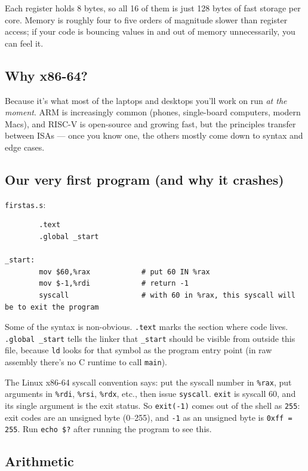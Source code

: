 \documentclass[11pt]{article}
\begin{document}
Each register holds 8 bytes, so all 16 of them is just 128 bytes of
fast storage per core. Memory is roughly four to five orders of
magnitude slower than register access; if your code is bouncing values
in and out of memory unnecessarily, you can feel it.

\subsection*{Why x86-64?}

Because it's what most of the laptops and desktops you'll work on run
\emph{at the moment}. ARM is increasingly common (phones, single-board
computers, modern Macs), and RISC-V is open-source and growing fast,
but the principles transfer between ISAs --- once you know one, the
others mostly come down to syntax and edge cases.

\subsection*{Our very first program (and why it crashes)}

\texttt{firstas.s}:

\begin{lstlisting}
        .text
        .global _start

_start:
        mov $60,%rax            # put 60 IN %rax
        mov $-1,%rdi            # return -1
        syscall                 # with 60 in %rax, this syscall will be to exit the program
\end{lstlisting}

Some of the syntax is non-obvious. \texttt{.text} marks the section
where code lives. \texttt{.global \_start} tells the linker that
\texttt{\_start} should be visible from outside this file, because
\texttt{ld} looks for that symbol as the program entry point (in raw
assembly there's no C runtime to call \texttt{main}).

The Linux x86-64 syscall convention says: put the syscall number in
\texttt{\%rax}, put arguments in \texttt{\%rdi}, \texttt{\%rsi},
\texttt{\%rdx}, etc., then issue \texttt{syscall}. \texttt{exit} is
syscall 60, and its single argument is the exit status. So
\texttt{exit(-1)} comes out of the shell as \texttt{255}: exit codes
are an unsigned byte (0--255), and \texttt{-1} as an unsigned byte is
\texttt{0xff = 255}. Run \texttt{echo \$?} after running the program
to see this.

\subsection*{Arithmetic}
\end{document}
